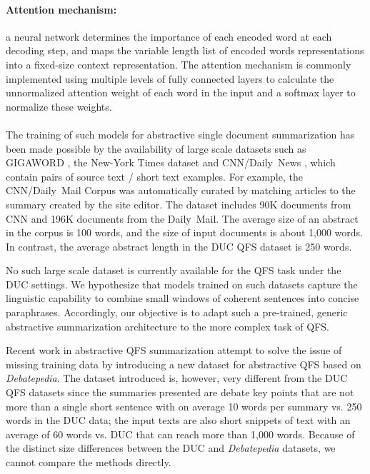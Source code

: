\documentclass[11pt,a4paper]{article}
\begin{document}
\paragraph{Attention mechanism:} a neural network determines the importance of each encoded word at each decoding step, and maps the variable length list of encoded words representations into a fixed-size context representation.  The attention mechanism is commonly implemented using multiple levels of fully connected layers to calculate the unnormalized attention weight of each word in the input and a softmax layer to normalize these weights. 

\paragraph*{}The training of such models for abstractive single document summarization has been made possible by the availability of large scale datasets such as GIGAWORD \cite{graff2003english}, the New-York Times dataset \cite{sandhaus2008new} and CNN/Daily~News \cite{nips15_hermann}, which contain pairs of source text / short text examples. 
For example, the CNN/Daily~Mail Corpus was automatically curated by matching articles to the summary created by the site editor.  The dataset includes 90K documents from CNN and 196K documents from the Daily~Mail. The average size of an abstract in the corpus is 100 words, and the size of input documents is about 1,000 words. In contrast, the average abstract length in the DUC QFS dataset is 250 words.

No such large scale dataset is currently available for the QFS task under the DUC settings. We hypothesize that models trained on such datasets capture the linguistic capability to combine small windows of coherent sentences into concise paraphrases.  Accordingly, our objective is to adapt such a pre-trained, generic abstractive summarization architecture to the more complex task of QFS.

Recent work in abstractive QFS summarization \cite{nema2017diversity} attempt to solve the issue of missing training data by introducing a new dataset for abstractive QFS based on \emph{Debatepedia}. The dataset introduced is, however, very different from the DUC QFS datasets since the summaries presented are debate key points that are not more than a single short sentence with on average 10 words per summary vs. 250 words in the DUC data; the input texts are also short snippets of text with an average of 60 words vs. DUC that can reach more than 1,000 words. Because of the distinct size differences between the DUC and \emph{Debatepedia} datasets, we cannot compare the methods directly.
\end{document}
